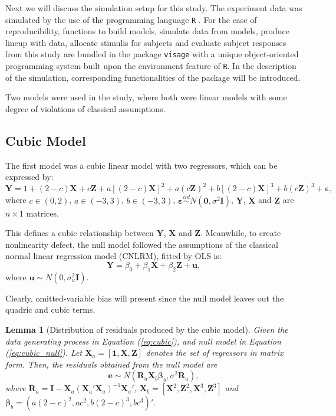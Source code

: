\documentclass{monashthesis}
\newtheorem{lemma}{Lemma}[chapter]
\theoremstyle{definition}
\theoremstyle{definition}
\theoremstyle{definition}
\theoremstyle{definition}
\theoremstyle{remark}
\begin{document}
Next we will discuss the simulation setup for this study. The experiment data was simulated by the use of the programming language \texttt{R} \autocite{r_core_team_r_2021}. For the ease of reproducibility, functions to build models, simulate data from models, produce lineup with data, allocate stimulis for subjects and evaluate subject responses from this study are bundled in the package \texttt{visage} with a unique object-oriented programming system built upon the environment feature of \texttt{R}. In the description of the simulation, corresponding functionalities of the package will be introduced.

Two models were used in the study, where both were linear models with some degree of violations of classical assumptions.

\hypertarget{cubic-model}{%
\subsection{Cubic Model}\label{cubic-model}}

The first model was a cubic linear model with two regressors, which can be expressed by:
\begin{equation} \label{eq:cubic}
\boldsymbol{Y}= 1 + (2-c)\boldsymbol{X} + c\boldsymbol{Z} + a[(2-c)\boldsymbol{X}]^2+a(c\boldsymbol{Z})^2+b[(2-c)\boldsymbol{X}]^3+b(c\boldsymbol{Z})^3+\boldsymbol{\varepsilon},
\end{equation}
where \(c \in (0,2)\), \(a \in (-3,3)\), \(b \in (-3,3)\), \(\boldsymbol{\varepsilon}\overset{iid}{\sim} N(\boldsymbol{0},\sigma^2\boldsymbol{I})\), \(\boldsymbol{Y}\), \(\boldsymbol{X}\) and \(\boldsymbol{Z}\) are \(n\times1\) matrices.

This defines a cubic relationship between \(\boldsymbol{Y}\), \(\boldsymbol{X}\) and \(\boldsymbol{Z}\). Meanwhile, to create nonlinearity defect, the null model followed the assumptions of the classical normal linear regression model (CNLRM), fitted by OLS is:
\begin{equation} \label{eq:cubic_null}
\boldsymbol{Y}=\beta_0+\beta_1\boldsymbol{X}+\beta_2\boldsymbol{Z}+\boldsymbol{u},
\end{equation}
where \(\boldsymbol{u} \sim N(0,\sigma^2_u\boldsymbol{I})\).

Clearly, omitted-variable bias will present since the null model leaves out the quadric and cubic terms.

\begin{lemma}[Distribution of residuals produced by the cubic model] \label{lemma:cubic}
Given the data generating process in Equation (\ref{eq:cubic}), and null model in Equation (\ref{eq:cubic_null}). Let $\boldsymbol{X}_a=[\boldsymbol{1},\boldsymbol{X},\boldsymbol{Z}]$ denotes the set of regressors in matrix form. Then, the residuals obtained from the null model are $$\boldsymbol{e} \sim N(\boldsymbol{R}_a\boldsymbol{X}_b\boldsymbol{\beta}_b, \sigma^2\boldsymbol{R}_a),$$ where $\boldsymbol{R}_a=\boldsymbol{I}-\boldsymbol{X}_a(\boldsymbol{X}_a'\boldsymbol{X}_a)^{-1}\boldsymbol{X}_a'$, $\boldsymbol{X}_b=[\boldsymbol{X}^2,\boldsymbol{Z}^2,\boldsymbol{X}^3,\boldsymbol{Z}^3]$ and $\boldsymbol{\beta}_b=(a(2-c)^2,ac^2,b(2-c)^3,bc^3)'$.
\end{lemma}
\end{document}
